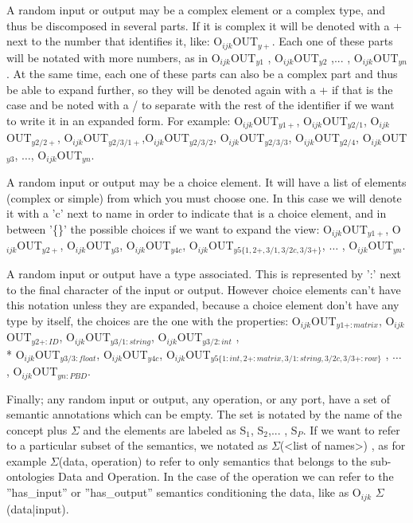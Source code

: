 \documentclass[a4paper,10pt]{article}
\begin{document}
  A random input or output may be a complex element or a complex type, and thus be discomposed in several parts. If it is complex it will be denoted with a + next to the number that identifies it, like: O$_{ijk}$OUT$_{y+}$. Each one of these parts will be notated with more numbers, as in O$_{ijk}$OUT$_{y1}$ , O$_{ijk}$OUT$_{y2}$ ,... , O$_{ijk}$OUT$_{yn}$ . At the same time, each one of these parts can also be a complex part and thus be able to expand further, so they will be denoted again with a + if that is the case and be noted with a / to separate with the rest of the identifier if we want to write it in an expanded form. For example: O$_{ijk}$OUT$_{y1+}$, O$_{ijk}$OUT$_{y2/1}$, O$_{ijk}$OUT$_{y2/2+}$, O$_{ijk}$OUT$_{y2/3/1+}$,O$_{ijk}$OUT$_{y2/3/2}$, O$_{ijk}$OUT$_{y2/3/3}$, O$_{ijk}$OUT$_{y2/4}$, O$_{ijk}$OUT$_{y3}$, $\dotsc$, O$_{ijk}$OUT$_{yn}$.\vspace{3 mm}

  A random input or output may be a choice element. It will have a list of elements (complex or simple) from which you must choose one. In this case we will denote it with a 'c' next to name in order to indicate that is a choice element, and in between '\{\}' the possible choices if we want to expand the view: O$_{ijk}$OUT$_{y1+}$, O$_{ijk}$OUT$_{y2+}$, O$_{ijk}$OUT$_{y3}$, O$_{ijk}$OUT$_{y4c}$, O$_{ijk}$OUT$_{y5\{1, 2+, 3/1, 3/2c, 3/3+ \}}$, $\dotsc$ , O$_{ijk}$OUT$_{yn}$.\vspace{3 mm}

  A random input or output have a type associated. This is represented by ':' next to the final character of the input or output. However choice elements can't have this notation unless they are expanded, because a choice element don't have any type by itself, the choices are the one with the properties: O$_{ijk}$OUT$_{y1+:matrix}$, O$_{ijk}$OUT$_{y2+:ID}$, O$_{ijk}$OUT$_{y3/1:string}$, O$_{ijk}$OUT$_{y3/2:int}$ ,\\* O$_{ijk}$OUT$_{y3/3:float}$, O$_{ijk}$OUT$_{y4c}$, O$_{ijk}$OUT$_{y5\{1:int, 2+:matrix, 3/1:string, 3/2c, 3/3+:row \}}$ , $\dotsc$ , O$_{ijk}$OUT$_{yn:PBD}$.\vspace{3 mm}

  Finally; any random input or output, any operation, or any port, have a set of semantic annotations which can be empty. The set is notated by the name of the concept plus $\Sigma$ and the elements are labeled as S$_{1}$, S$_{2}$,... , S$_{P}$. If we want to refer to a particular subset of the semantics, we notated as $\Sigma$(<list of names>) , as for example $\Sigma$(data, operation) to refer to only semantics that belongs to the sub-ontologies Data and Operation. In the case of the operation we can refer to the ''has\_input'' or ''has\_output'' semantics conditioning the data, like as O$_{ijk}$ $\Sigma$(data|input).
\end{document}
